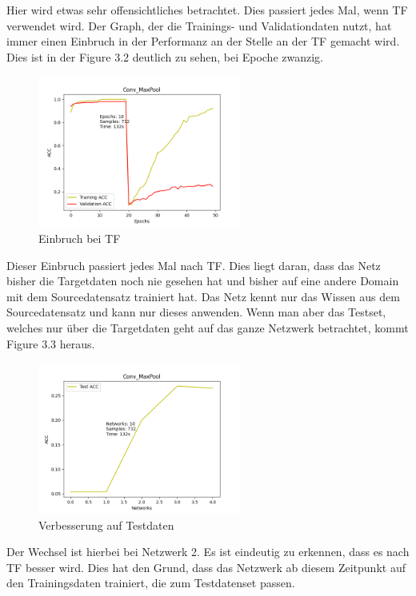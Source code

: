 Hier wird etwas sehr offensichtliches betrachtet. Dies passiert jedes Mal, wenn TF verwendet wird. 
Der Graph, der die Trainings- und Validationdaten nutzt, hat immer einen Einbruch in der Performanz an der Stelle an 
der TF gemacht wird. Dies ist in der Figure 3.2 deutlich zu sehen, bei Epoche zwanzig.

\begin{figure}[htpb]
    \includegraphics[height=5cm]{../../Plots/ba_plots/convmaxpool/convmaxpooltrain.png}
    \caption{\label{fig:convmaxpooltrain} Einbruch bei TF}
\end{figure}

Dieser Einbruch passiert jedes Mal nach TF. Dies liegt daran, dass das Netz bisher die Targetdaten noch nie gesehen hat und bisher 
auf eine andere Domain mit dem Sourcedatensatz trainiert hat. Das Netz kennt nur das Wissen aus dem Sourcedatensatz und kann nur dieses 
anwenden. Wenn man aber das Testset, welches nur über die Targetdaten geht auf das ganze Netzwerk betrachtet, kommt Figure 3.3 heraus. 

\begin{figure}[htpb]
    \includegraphics[height=5cm]{../../Plots/ba_plots/convmaxpool/convmaxpooltest.png}
    \caption{\label{fig:convmaxpooltest} Verbesserung auf Testdaten}
\end{figure}

Der Wechsel ist hierbei bei Netzwerk 2. Es ist eindeutig zu erkennen, dass es nach TF besser wird. Dies hat den Grund, dass das Netzwerk 
ab diesem Zeitpunkt auf den Trainingsdaten trainiert, die zum Testdatenset passen. 
